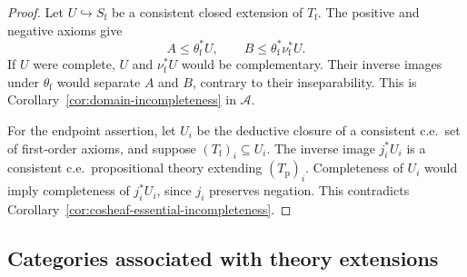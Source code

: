\begin{proof}
Let $U\hookrightarrow S_{\mathrm f}$ be a consistent closed extension of
$T_{\mathrm f}$. The positive and negative axioms give
\[
 A\leq \theta_{\mathrm f}^{*}U,\qquad
 B\leq \theta_{\mathrm f}^{*}\nu_{\mathrm f}^{*}U .
\]
If $U$ were complete, $U$ and $\nu_{\mathrm f}^{*}U$ would be
complementary. Their inverse images under $\theta_{\mathrm f}$
would separate $A$ and $B$, contrary to their inseparability.
This is Corollary~\ref{cor:domain-incompleteness} in $\mathcal A$.

For the endpoint assertion, let $U_i$ be the deductive closure
of a consistent c.e.\ set of first-order axioms, and suppose
$(T_{\mathrm f})_i\subseteq U_i$. The inverse image $j_i^*U_i$ is a
consistent c.e.\ propositional theory extending
$(T_{\mathrm p})_i$. Completeness of $U_i$ would imply
completeness of $j_i^*U_i$, since $j_i$ preserves negation.
This contradicts Corollary~\ref{cor:cosheaf-essential-incompleteness}.
\end{proof}

\subsection{Categories associated with theory extensions}

